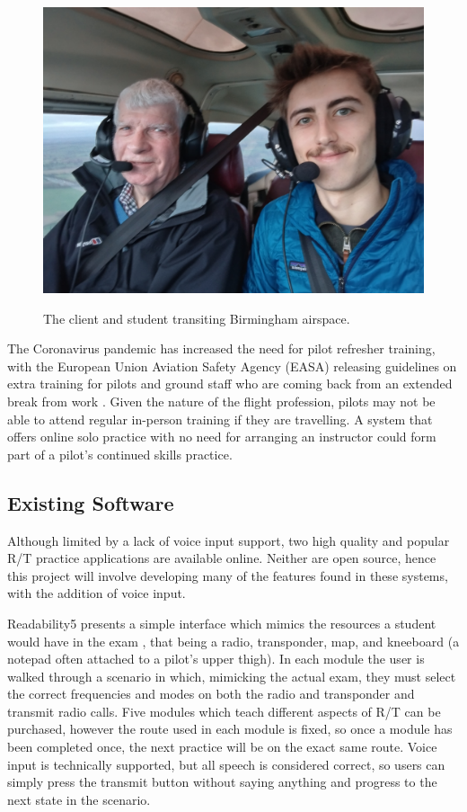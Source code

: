 \begin{figure}[H]
    \centering
	\includegraphics[scale = 0.08]{../document-resources/images/Aerial-selfie}
    \label{aerial-selfie}
    \caption{The client and student transiting Birmingham airspace.}
\end{figure}

The Coronavirus pandemic has increased the need for pilot refresher training, with the European Union Aviation Safety Agency (EASA) releasing guidelines on extra training for pilots and ground staff who are coming back from an extended break from work \cite{EASA-Training-Post-Covid}. Given the nature of the flight profession, pilots may not be able to attend regular in-person training if they are travelling. A system that offers online solo practice with no need for arranging an instructor could form part of a pilot’s continued skills practice.

\subsection{Existing Software}
Although limited by a lack of voice input support, two high quality and popular R/T practice applications are available online. Neither are open source, hence this project will involve developing many of the features found in these systems, with the addition of voice input.

Readability5 presents a simple interface which mimics the resources a student would have in the exam \cite{Readability5}, that being a radio, transponder, map, and kneeboard (a notepad often attached to a pilot's upper thigh). In each module the user is walked through a scenario in which, mimicking the actual exam, they must select the correct frequencies and modes on both the radio and transponder and transmit radio calls. Five modules which teach different aspects of R/T can be purchased, however the route used in each module is fixed, so once a module has been completed once, the next practice will be on the exact same route. Voice input is technically supported, but all speech is considered correct, so users can simply press the transmit button without saying anything and progress to the next state in the scenario.

